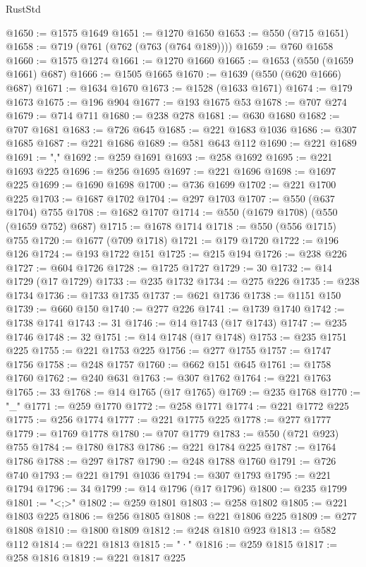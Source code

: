 \begin{lexlean}{RustStd}
\begin{coremodule}
@1650 := @1575 @1649
@1651 := @1270 @1650
@1653 := @550 (@715 @1651)
@1658 := @719 (@761 (@762 (@763 (@764 @189))))
@1659 := @760 @1658
@1660 := @1575 @1274
@1661 := @1270 @1660
@1665 := @1653 (@550 (@1659 @1661) @687)
@1666 := @1505 @1665
@1670 := @1639 (@550 (@620 @1666) @687)
@1671 := @1634 @1670
@1673 := @1528 (@1633 @1671)
@1674 := @179 @1673
@1675 := @196 @904
@1677 := @193 @1675 @53
@1678 := @707 @274
@1679 := @714 @711
@1680 := @238 @278
@1681 := @630 @1680
@1682 := @707 @1681
@1683 := @726 @645
@1685 := @221 @1683 @1036
@1686 := @307 @1685
@1687 := @221 @1686
@1689 := @581 @643 @112
@1690 := @221 @1689
@1691 := ","
@1692 := @259 @1691
@1693 := @258 @1692
@1695 := @221 @1693 @225
@1696 := @256 @1695
@1697 := @221 @1696
@1698 := @1697 @225
@1699 := @1690 @1698
@1700 := @736 @1699
@1702 := @221 @1700 @225
@1703 := @1687 @1702
@1704 := @297 @1703
@1707 := @550 (@637 @1704) @755
@1708 := @1682 @1707
@1714 := @550 (@1679 @1708) (@550 (@1659 @752) @687)
@1715 := @1678 @1714
@1718 := @550 (@556 @1715) @755
@1720 := @1677 (@709 @1718)
@1721 := @179 @1720
@1722 := @196 @126
@1724 := @193 @1722 @151
@1725 := @215 @194
@1726 := @238 @226
@1727 := @604 @1726
@1728 := @1725 @1727
@1729 := 30
@1732 := @14 @1729 (@17 @1729)
@1733 := @235 @1732
@1734 := @275 @226
@1735 := @238 @1734
@1736 := @1733 @1735
@1737 := @621 @1736
@1738 := @1151 @150
@1739 := @660 @150
@1740 := @277 @226
@1741 := @1739 @1740
@1742 := @1738 @1741
@1743 := 31
@1746 := @14 @1743 (@17 @1743)
@1747 := @235 @1746
@1748 := 32
@1751 := @14 @1748 (@17 @1748)
@1753 := @235 @1751 @225
@1755 := @221 @1753 @225
@1756 := @277 @1755
@1757 := @1747 @1756
@1758 := @248 @1757
@1760 := @662 @151 @645
@1761 := @1758 @1760
@1762 := @240 @631
@1763 := @307 @1762
@1764 := @221 @1763
@1765 := 33
@1768 := @14 @1765 (@17 @1765)
@1769 := @235 @1768
@1770 := "_"
@1771 := @259 @1770
@1772 := @258 @1771
@1774 := @221 @1772 @225
@1775 := @256 @1774
@1777 := @221 @1775 @225
@1778 := @277 @1777
@1779 := @1769 @1778
@1780 := @707 @1779
@1783 := @550 (@721 @923) @755
@1784 := @1780 @1783
@1786 := @221 @1784 @225
@1787 := @1764 @1786
@1788 := @297 @1787
@1790 := @248 @1788 @1760
@1791 := @726 @740
@1793 := @221 @1791 @1036
@1794 := @307 @1793
@1795 := @221 @1794
@1796 := 34
@1799 := @14 @1796 (@17 @1796)
@1800 := @235 @1799
@1801 := "<;>"
@1802 := @259 @1801
@1803 := @258 @1802
@1805 := @221 @1803 @225
@1806 := @256 @1805
@1808 := @221 @1806 @225
@1809 := @277 @1808
@1810 := @1800 @1809
@1812 := @248 @1810 @923
@1813 := @582 @112
@1814 := @221 @1813
@1815 := "·"
@1816 := @259 @1815
@1817 := @258 @1816
@1819 := @221 @1817 @225

\end{coremodule}
\end{lexlean}
